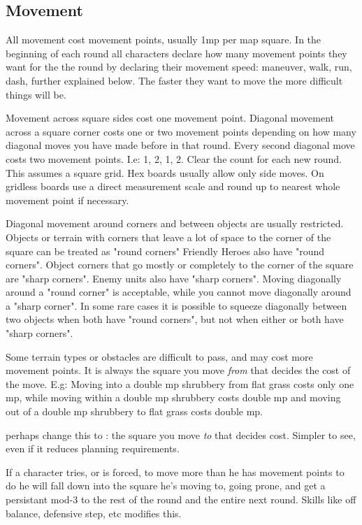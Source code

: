 \subsection*{Movement}
All movement cost movement points, usually 1mp per map square. In the beginning of each round all characters declare how many movement points they want for the the round by declaring their movement speed: maneuver, walk, run, dash, further explained below. The faster they want to move the more difficult things will be.

Movement across square sides cost one movement point. Diagonal movement across a square corner costs one or two movement points depending on how many diagonal moves you have made before in that round. Every second diagonal move costs two movement points. I.e: 1, 2, 1, 2. Clear the count for each new round.
This assumes a square grid. Hex boards usually allow only side moves. On gridless boards use a direct measurement scale and round up to nearest whole movement point if necessary.

Diagonal movement around corners and between objects are usually restricted.
Objects or terrain with corners that leave a lot of space to the corner of the square can be treated as "round corners" Friendly Heroes also have "round corners".
Object corners that go mostly or completely to the corner of the square are "sharp corners". Enemy units also have "sharp corners".
Moving diagonally around a "round corner" is acceptable, while you cannot move diagonally around a "sharp corner". In some rare cases it is possible to squeeze diagonally between two objects when both have "round corners", but not when either or both have "sharp corners".

Some terrain types or obstacles are difficult to pass, and may cost more movement points. It is always the square you move \emph{from} that decides the cost of the move. E.g: Moving into a double mp shrubbery from flat grass costs only one mp, while moving within a double mp shrubbery costs double mp and moving out of a double mp shrubbery to flat grass costs double mp.

\todo perhaps change this to : the square you move \emph{to} that decides cost. Simpler to see, even if it reduces planning requirements.

If a character tries, or is forced, to move more than he has movement points to do he will fall down into the square he's moving to, going prone, and get a persistant mod-3 to the rest of the round and the entire next round. Skills like off balance, defensive step, etc modifies this.


